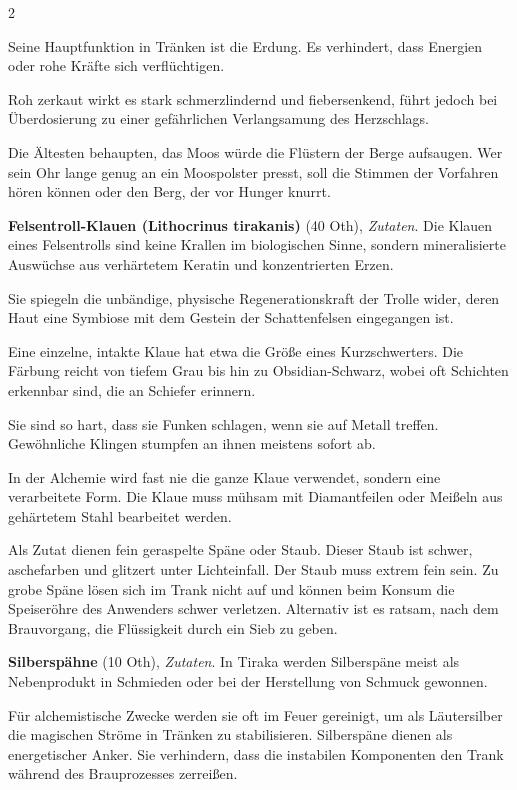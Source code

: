 \begin{multicols}{2}
\begin{denseitemize}
Seine Hauptfunktion in Tränken ist die Erdung. Es verhindert, dass Energien oder rohe Kräfte sich verflüchtigen.

Roh zerkaut wirkt es stark schmerzlindernd und fiebersenkend, führt jedoch bei Überdosierung zu einer gefährlichen Verlangsamung des Herzschlags.

Die Ältesten behaupten, das Moos würde die Flüstern der Berge aufsaugen. Wer sein Ohr lange genug an ein Moospolster presst, soll die Stimmen der Vorfahren hören können oder den Berg, der vor Hunger knurrt.
        \item \textbf{Felsentroll-Klauen (Lithocrinus tirakanis)} (40 Oth), \textit{Zutaten}.
        Die Klauen eines Felsentrolls sind keine Krallen im biologischen Sinne, sondern mineralisierte Auswüchse aus verhärtetem Keratin und konzentrierten Erzen.

Sie spiegeln die unbändige, physische Regenerationskraft der Trolle wider, deren Haut eine Symbiose mit dem Gestein der Schattenfelsen eingegangen ist.

Eine einzelne, intakte Klaue hat etwa die Größe eines Kurzschwerters.
Die Färbung reicht von tiefem Grau bis hin zu Obsidian-Schwarz, wobei oft Schichten erkennbar sind, die an Schiefer erinnern.

Sie sind so hart, dass sie Funken schlagen, wenn sie auf Metall treffen. Gewöhnliche Klingen stumpfen an ihnen meistens sofort ab.

In der Alchemie wird fast nie die ganze Klaue verwendet, sondern eine verarbeitete Form. Die Klaue muss mühsam mit Diamantfeilen oder Meißeln aus gehärtetem Stahl bearbeitet werden. 

Als Zutat dienen fein geraspelte Späne oder Staub. Dieser Staub ist schwer, aschefarben und glitzert unter Lichteinfall.
Der Staub muss extrem fein sein. Zu grobe Späne lösen sich im Trank nicht auf und können beim Konsum die Speiseröhre des Anwenders schwer verletzen. Alternativ ist es ratsam, nach dem Brauvorgang, die Flüssigkeit durch ein Sieb zu geben.
        \item \textbf{Silberspähne} (10 Oth), \textit{Zutaten}.
        In Tiraka werden Silberspäne meist als Nebenprodukt in Schmieden oder bei der Herstellung von Schmuck gewonnen.

Für alchemistische Zwecke werden sie oft im Feuer gereinigt, um als Läutersilber die magischen Ströme in Tränken zu stabilisieren.
Silberspäne dienen als energetischer Anker. Sie verhindern, dass die instabilen Komponenten den Trank während des Brauprozesses zerreißen.
    \end{denseitemize}



\end{multicols}
